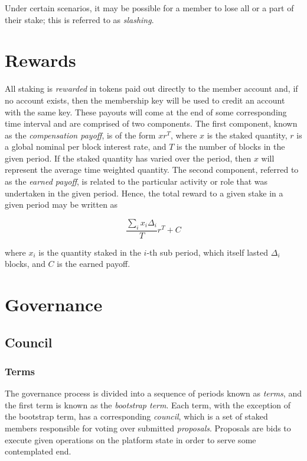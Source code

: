 \documentclass{article}
\begin{document}
Under certain scenarios, it may be possible for a member to lose all or a part of their stake; this is referred to as \textit{slashing}.

\section{Rewards}

All staking is \textit{rewarded} in tokens paid out directly to the member account and, if no account exists, then the membership key will be used to credit an account with the same key. These payouts will come at the end of some corresponding time interval and are comprised of two components. The first component, known as the \textit{compensation payoff}, is of the form $xr^{T}$, where $x$ is the staked quantity, $r$ is a global nominal per block interest rate, and $T$ is the number of blocks in the given period. If the staked quantity has varied over the period, then $x$ will represent the average time weighted quantity. The second component, referred to as the \textit{earned payoff}, is related to the particular activity or role that was undertaken in the given period. Hence, the total reward to a given stake in a given period may be written as

$$ \frac{\sum_i x_i\Delta_i}{T}r^T + C$$

where $x_i$ is the quantity staked in the $i$-th sub period, which itself lasted $\Delta_i$ blocks, and $C$ is the earned payoff.

\section{Governance}

\subsection{Council}

\subsubsection{Terms}

The governance process is divided into a sequence of periods known as \textit{terms}, and the first term is known as the \textit{bootstrap term}. Each term, with the exception of the bootstrap term, has a corresponding \textit{council}, which is a set of staked members responsible for voting over submitted \textit{proposals}. Proposals are bids to execute given operations on the platform state in order to serve some contemplated end.
\end{document}
